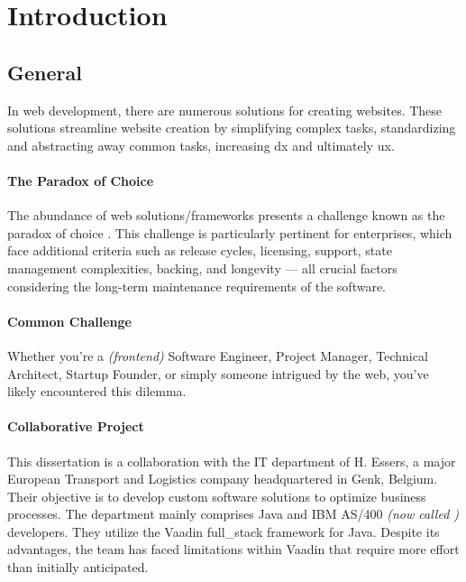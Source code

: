 \chapter{Introduction}

\section{General}
In web development, there are numerous solutions for creating websites. These solutions streamline website creation by simplifying complex tasks, standardizing and abstracting away common tasks, increasing \acrshort{dx} and ultimately \acrshort{ux}.

\subsubsection{The Paradox of Choice}
The abundance of web solutions/frameworks presents a challenge known as the paradox of choice \cite{the_decision_lab:paradox_of_choice}. This challenge is particularly pertinent for enterprises, which face additional criteria such as release cycles, licensing, support, state management complexities, backing, and longevity — all crucial factors considering the long-term maintenance requirements of the software.

\subsubsection{Common Challenge}

Whether you're a \textit{(frontend)} Software Engineer, Project Manager, Technical Architect, Startup Founder, or simply someone intrigued by the web, you've likely encountered this dilemma.

\subsubsection{Collaborative Project}

This dissertation is a collaboration with the IT department of H. Essers, a major European Transport and Logistics company headquartered in Genk, Belgium. Their objective is to develop custom software solutions to optimize business processes. The department mainly comprises Java and IBM AS/400 \textit{(now called  \cite{enwiki:ibm_i})} developers. They utilize the Vaadin \gls{full_stack} \gls{framework} for Java. Despite its advantages, the team has faced limitations within Vaadin that require more effort than initially anticipated.

